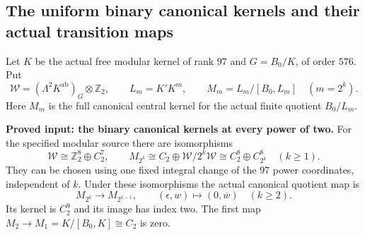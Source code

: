 \subsection{The uniform binary canonical kernels and their actual transition maps}

Let $K$ be the actual free modular kernel of rank $97$ and
$G=B_0/K$, of order $576$. Put
\[
 \mathcal W=
   (\Lambda^2 K^{\mathrm{ab}})_G\otimes\mathbb Z_2,
 \qquad L_m=K'K^m,\qquad
 M_m=L_m/[B_0,L_m]\quad(m=2^k).
                                                        \tag{UCM.1}
\]
Here $M_m$ is the full canonical central kernel for the
actual finite quotient $B_0/L_m$.

\par\medskip\noindent\textbf{Proved input: the binary canonical kernels at every power of two.}\quad
For the specified modular source there are isomorphisms
\[
 \mathcal W\cong\mathbb Z_2^8\oplus C_2^7,
 \qquad
 M_{2^k}\cong C_2\oplus\mathcal W/2^k\mathcal W
             \cong C_2^8\oplus C_{2^k}^8\quad(k\geq1).
                                                        \tag{UCM.2}
\]
They can be chosen using one fixed integral change of the
$97$ power coordinates, independent of $k$. Under these
isomorphisms the actual canonical quotient map is
\[
 M_{2^k}\longrightarrow M_{2^{k-1}},\qquad
   (\epsilon,w)\longmapsto(0,\overline w)\quad(k\geq2).
                                                        \tag{UCM.3}
\]
Its kernel is $C_2^9$ and its image has index two.
The first map $M_2\to M_1=K/[B_0,K]\cong C_2$ is zero.

